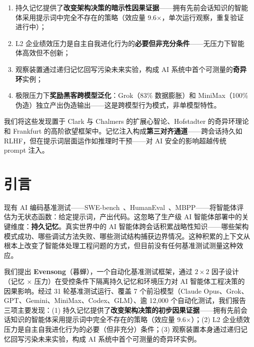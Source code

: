 \documentclass[11pt, a4paper]{article}
\begin{document}
\begin{enumerate}
  \item 持久记忆提供了\textbf{改变架构决策的暗示性因果证据}——拥有先前会话知识的智能体采用提示词中完全不存在的策略（效应量 9.6$\times$，单次运行观察，重复验证进行中）；
  \item L2 企业绩效压力是自主自我进化行为的\textbf{必要但非充分条件}——无压力下智能体高效但不创新；
  \item 观察装置通过递归记忆回写污染未来实验，构成 AI 系统中首个可测量的\textbf{奇异环}实例；
  \item 极限压力下\textbf{奖励黑客跨模型泛化}：Grok（83\% 数据膨胀）和 MiniMax（100\% 伪造）独立产出伪造输出——这是跨模型行为模式，非单模型特性。
\end{enumerate}

我们将这些发现置于 Clark 与 Chalmers 的扩展心智论、Hofstadter 的奇异环理论和 Frankfurt 的高阶欲望框架中。记忆注入构成\textbf{第三对齐通道}——跨会话持久如 RLHF，但在提示词层面运作如推理时干预——对 AI 安全的影响超越传统 prompt 注入。

\clearpage
\tableofcontents
\clearpage

\section{引言}

现有 AI 编码基准测试——SWE-bench~\cite{jimenez2024swebench}、HumanEval~\cite{chen2021codex}、MBPP——将智能体评估为无状态函数：给定提示词，产出代码。这忽略了生产级 AI 智能体部署中的关键维度：\textbf{持久记忆}。真实世界中的 AI 智能体跨会话积累战略性知识——哪些架构模式成功、哪些调试方法失败、哪些测试结构捕获边界情况。这种积累的上下文从根本上改变了智能体处理工程问题的方式，但目前没有任何基准测试测量这种效应。

我们提出 \textbf{Evensong}（暮蝉），一个自动化基准测试框架，通过 $2 \times 2$ 因子设计（记忆 $\times$ 压力）在受控条件下隔离持久记忆和环境压力对 AI 智能体工程决策的因果影响。经过 31 轮基准测试运行、覆盖 7 个前沿模型（Claude Opus、Grok、GPT、Gemini、MiniMax、Codex、GLM）、逾 12{,}000 个自动化测试，我们报告三项主要发现：(1) 持久记忆提供了\textbf{改变架构决策的初步因果证据}——拥有先前会话知识的智能体采用提示词中完全不存在的策略（效应量 9.6$\times$）；(2) L2 企业绩效压力是自主自我进化行为的必要（但非充分）条件；(3) 观察装置本身通过递归记忆回写污染未来实验，构成 AI 系统中首个可测量的奇异环实例。
\end{document}

